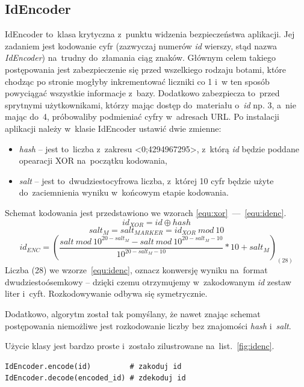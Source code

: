 \documentclass[a4paper,12pt,oneside]{report}
\begin{document}
\subsection{IdEncoder}
\label{sub:idencoder}
  IdEncoder to~klasa krytyczna z~punktu widzenia bezpieczeństwa aplikacji. Jej zadaniem jest kodowanie cyfr (zazwyczaj numerów \emph{id} wierszy, stąd nazwa \emph{IdEncoder}) na~trudny do~złamania ciąg znaków. Głównym celem takiego postępowania jest zabezpieczenie się przed wszelkiego rodzaju botami, które chodząc po stronie mogłyby inkrementować liczniki co 1 i~w ten sposób powyciągać wszystkie informacje z~bazy. Dodatkowo zabezpiecza to~przed sprytnymi użytkownikami, którzy mając dostęp do~materiału o~\emph{id} np. 3, a~nie mając do~4, próbowaliby podmieniać cyfry w~adresach URL. Po instalacji aplikacji należy w~klasie IdEncoder ustawić dwie zmienne:
\begin{itemize}
  \item \emph{hash} -- jest to~liczba z~zakresu <0;4294967295>, z~którą \emph{id} będzie poddane opearacji XOR na~początku kodowania,
  \item \emph{salt} -- jest to~dwudziestocyfrowa liczba, z~której 10 cyfr będzie użyte do~zaciemnienia wyniku w~końcowym etapie kodowania.
\end{itemize}
Schemat kodowania jest przedstawiono we wzorach \ref{equ:xor}~---~\ref{equ:idenc}.
\begin{equation}
  id_{XOR} = id \oplus hash
  \label{equ:xor}
\end{equation}
\begin{equation}
  salt_{M} = salt_{MARKER} = id_{XOR}~mod~10
  \label{equ:salt}
\end{equation}
\begin{equation}
  id_{ENC} = \left(\frac{salt~mod~10^{20 - salt_{M}} - salt~mod~10^{20 - salt_{M} - 10}}{10^{20 - salt_{M} - 10}} * 10 + salt_{M}\right)_{(28)}
  \label{equ:idenc}
\end{equation}
Liczba (28) we wzorze~\ref{equ:idenc}, oznacz konwersję wyniku na~format dwudziestoósemkowy -- dzięki czemu otrzymujemy w~zakodowanym \emph{id} zestaw liter i~cyft. Rozkodowywanie odbywa się symetrycznie. 

Dodatkowo, algorytm został tak pomyślany, że nawet znając schemat postępowania niemożliwe jest rozkodowanie liczby bez znajomości \emph{hash} i~\emph{salt}.

Użycie klasy jest bardzo proste i~zostało zilustrowane na~list.~\ref{fig:idenc}.

\begin{lstlisting}[caption={Użycie polecenia IdEncoder},label=fig:idenc,captionpos=b]
IdEncoder.encode(id)         # zakoduj id
IdEncoder.decode(encoded_id) # zdekoduj id
\end{lstlisting}
\end{document}
